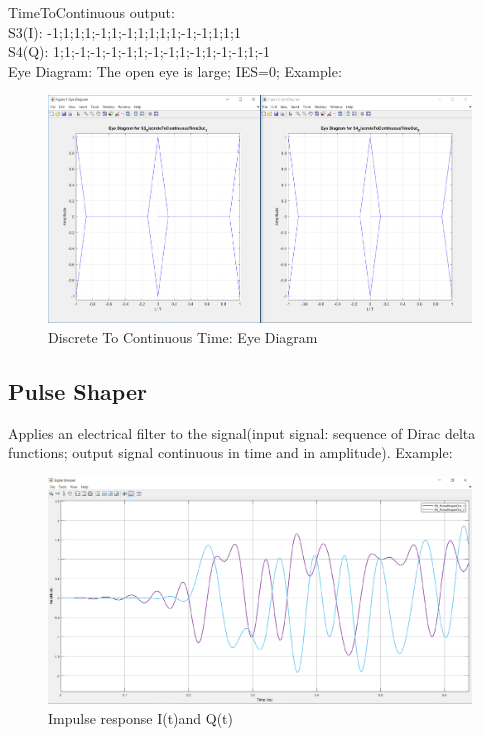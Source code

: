 TimeToContinuous output: \\
S3(I): -1;1;1;1;-1;1;-1;1;1;1;1;-1;-1;1;1;1\\
S4(Q): 1;1;-1;-1;-1;-1;1;-1;-1;1;-1;1;-1;-1;1;-1\\
Eye Diagram: The open eye is large; IES=0;
Example:
\begin{figure}[h]
	\centering
	\includegraphics[width=1\textwidth]{../lib/m_qam_transmitter/figures/S3_S4_eye.pdf}
	\caption{Discrete To Continuous Time: Eye Diagram}\label{fig:Discrete To Continuous Time: Eye Diagram}
\end{figure}
\subsection*{Pulse Shaper}
Applies an electrical filter to the signal(input signal: sequence of Dirac delta functions; output signal continuous in time and in amplitude).
Example:
\begin{figure}[h]
	\centering
	\includegraphics[width=1\textwidth]{../lib/m_qam_transmitter/figures/S5_S6.pdf}
	\caption{Impulse response I(t)and Q(t)}\label{fig:Impulse response I(t)and Q(t)}
\end{figure}

